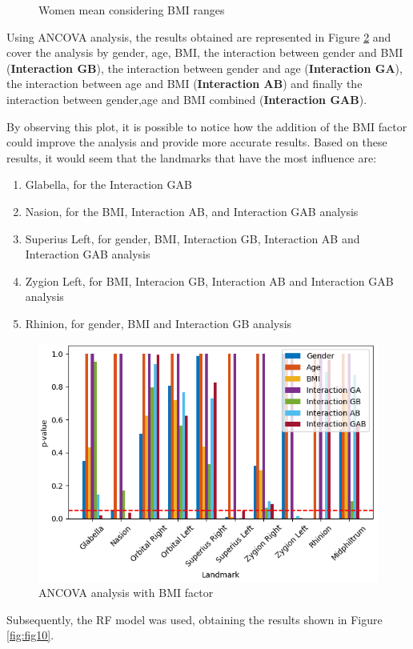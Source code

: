 \documentclass[journal,article,submit,pdftex,moreauthors]{Definitions/mdpi}
\begin{document}
\begin{figure}[H]
\begin{minipage}{0.45\textwidth}
        \caption{Women mean considering BMI ranges}
        \label{fig:fig8}
    \end{minipage}
\end{figure}


Using ANCOVA analysis, the results obtained are represented in Figure \ref{fig:fig9} and cover the analysis by gender, age, BMI, the interaction between gender and BMI (\textbf{Interaction GB}), the interaction between gender and age (\textbf{Interaction GA}), the interaction between age and BMI (\textbf{Interaction AB}) and finally the interaction between gender,age and BMI combined (\textbf{Interaction GAB}).

By observing this plot, it is possible to notice how the addition of the BMI factor could improve the analysis and provide more accurate results. Based on these results, it would seem that the landmarks that have the most influence are:
\begin{enumerate}
    \item Glabella, for the Interaction GAB
    \item Nasion, for the BMI, Interaction AB, and Interaction GAB analysis
    \item Superius Left, for gender, BMI, Interaction GB, Interaction AB and Interaction GAB analysis 
    \item Zygion Left, for BMI, Interacion GB, Interaction AB and Interaction GAB analysis
    \item Rhinion, for gender, BMI and Interaction GB analysis

\end{enumerate}


\begin{figure}[H]
    \centering
    \includegraphics[width=0.6\linewidth]{Definitions/ANCOVA_BMI_after_cleaning.png}
    \caption{ANCOVA analysis with BMI factor}
    \label{fig:fig9}
\end{figure}

Subsequently, the RF model was used, obtaining the results shown in Figure \ref{fig:fig10}.
\end{document}
